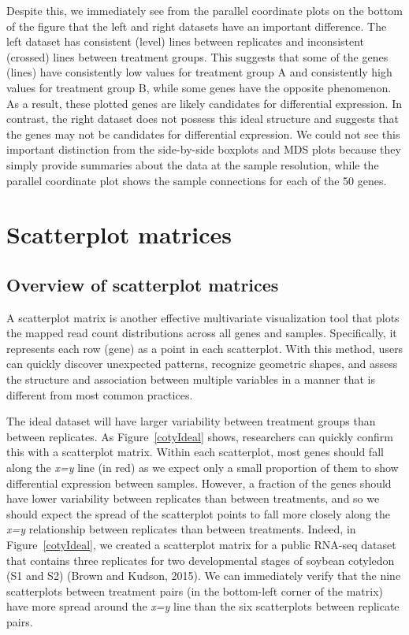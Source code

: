 \documentclass[referee]{biom}
\begin{document}
Despite this, we immediately see from the parallel coordinate plots on the bottom of the figure that the left and right datasets have an important difference. The left dataset has consistent (level) lines between replicates and inconsistent (crossed) lines between treatment groups. This suggests that some of the genes (lines) have consistently low values for treatment group A and consistently high values for treatment group B, while some genes have the opposite phenomenon. As a result, these plotted genes are likely candidates for differential expression. In contrast, the right dataset does not possess this ideal structure and suggests that the genes may not be candidates for differential expression. We could not see this important distinction from the side-by-side boxplots and MDS plots because they simply provide summaries about the data at the sample resolution, while the parallel coordinate plot shows the sample connections for each of the 50 genes.

\section{Scatterplot matrices}
\label{s:Scatterplot matrices}

\subsection{Overview of scatterplot matrices}
\label{s:Overview of scatterplot matrices}

A scatterplot matrix is another effective multivariate visualization tool that plots the mapped read count distributions across all genes and samples. Specifically, it represents each row (gene) as a point in each scatterplot. With this method, users can quickly discover unexpected patterns, recognize geometric shapes, and assess the structure and association between multiple variables in a manner that is different from most common practices. 

The ideal dataset will have larger variability between treatment groups than between replicates. As Figure~\ref{cotyIdeal} shows, researchers can quickly confirm this with a scatterplot matrix. Within each scatterplot, most genes should fall along the \textit{x=y} line (in red) as we expect only a small proportion of them to show differential expression between samples. However, a fraction of the genes should have lower variability between replicates than between treatments, and so we should expect the spread of the scatterplot points to fall more closely along the \textit{x=y} relationship between replicates than between treatments. Indeed, in Figure~\ref{cotyIdeal}, we created a scatterplot matrix for a public RNA-seq dataset that contains three replicates for two developmental stages of soybean cotyledon (S1 and S2) (Brown and Kudson, 2015). We can immediately verify that the nine scatterplots between treatment pairs (in the bottom-left corner of the matrix) have more spread around the \textit{x=y} line than the six scatterplots between replicate pairs.
\end{document}

